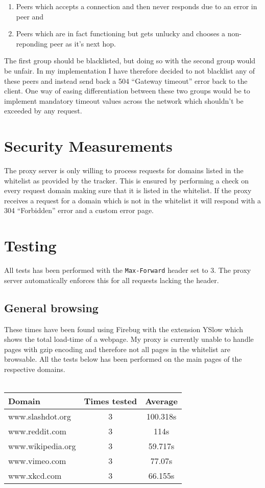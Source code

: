\documentclass{sig-alternate}
\begin{document}
\begin{enumerate}
\item Peers which accepts a connection and then never responds due to
  an error in peer and
\item Peers which are in fact functioning but gets unlucky and chooses
  a non-reponding peer as it's next hop.
\end{enumerate}

The first group should be blacklisted, but doing so with the second
group would be unfair. In my implementation I have therefore decided
to not blacklist any of these peers and instead send back a 504
``Gateway timeout'' error back to the client. One way of easing differentiation
between these two groups would be to implement mandatory timeout
values across the network which shouldn't be exceeded by any request.

\section{Security Measurements}
The proxy server is only willing to process requests for domains
listed in the whitelist as provided by the tracker. This is ensured by
performing a check on every request domain making sure that it is
listed in the whitelist. If the proxy receives a request for a domain
which is not in the whitelist it will respond with a 304 ``Forbidden''
error and a custom error page.

\section{Testing}

All tests has been performed with the \verb!Max-Forward! header set to
3. The proxy server automatically enforces this for all requests
lacking the header.

\subsection{General browsing}
These times have been found using Firebug with the extension YSlow
which shows the total load-time of a webpage. My proxy is currently
unable to handle pages with gzip encoding and therefore not all pages
in the whitelist are browsable. All the tests below has been performed
on the main pages of the respective domains.
\\
\\

\begin{tabular}{|l|c|c|}
\hline
\textbf{Domain} & \textbf{Times tested} & \textbf{Average} \\
\hline
www.slashdot.org & 3 & 100.318s\\
\hline
www.reddit.com & 3 & 114s\\
\hline
www.wikipedia.org & 3 & 59.717s \\
\hline
www.vimeo.com & 3 & 77.07s\\

\hline
www.xkcd.com & 3 & 66.155s\\
\hline
\end{tabular}
\end{document}
